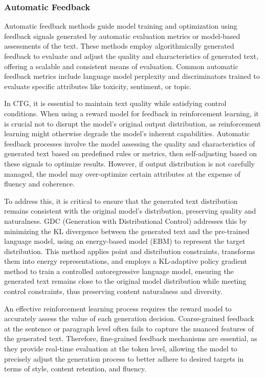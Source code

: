 \documentclass[acmsmall, screen]{acmart}
\begin{document}
\subsubsection{\textbf{Automatic Feedback}} 
Automatic feedback methods guide model training and optimization using feedback signals generated by automatic evaluation metrics or model-based assessments of the text. These methods employ algorithmically generated feedback to evaluate and adjust the quality and characteristics of generated text, offering a scalable and consistent means of evaluation. Common automatic feedback metrics include language model perplexity \cite{jozefowicz_arxiv16_perplexity} and discriminators trained to evaluate specific attributes like toxicity, sentiment, or topic.

In CTG, it is essential to maintain text quality while satisfying control conditions. When using a reward model for feedback in reinforcement learning, it is crucial not to disrupt the model's original output distribution, as reinforcement learning might otherwise degrade the model's inherent capabilities. Automatic feedback processes involve the model assessing the quality and characteristics of generated text based on predefined rules or metrics, then self-adjusting based on these signals to optimize results. However, if output distribution is not carefully managed, the model may over-optimize certain attributes at the expense of fluency and coherence.

To address this, it is critical to ensure that the generated text distribution remains consistent with the original model's distribution, preserving quality and naturalness. GDC (Generation with Distributional Control) \cite{khalifa_iclr21_GDC} addresses this by minimizing the KL divergence between the generated text and the pre-trained language model, using an energy-based model (EBM) to represent the target distribution. This method applies point and distribution constraints, transforms them into energy representations, and employs a KL-adaptive policy gradient method to train a controlled autoregressive language model, ensuring the generated text remains close to the original model distribution while meeting control constraints, thus preserving content naturalness and diversity.

An effective reinforcement learning process requires the reward model to accurately assess the value of each generation decision. Coarse-grained feedback at the sentence or paragraph level often fails to capture the nuanced features of the generated text. Therefore, fine-grained feedback mechanisms are essential, as they provide real-time evaluation at the token level, allowing the model to precisely adjust the generation process to better adhere to desired targets in terms of style, content retention, and fluency.
\end{document}
